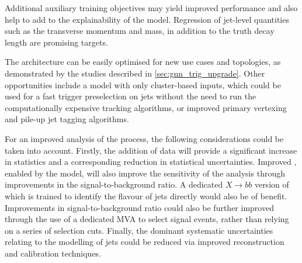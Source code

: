 Additional auxiliary training objectives may yield improved performance and also help to add to the explainability of the model.
Regression of jet-level quantities such as the transverse momentum and mass, in addition to the truth \bhadron decay length are promising targets.

The \GNN architecture can be easily optimised for new use cases and topologies, as demonstrated by the studies described in \cref{sec:gnn_trig_upgrade}.
Other opportunities include a model with only cluster-based inputs, which could be used for a fast trigger preselection on jets without the need to run the computationally expensive tracking algorithms, or improved primary vertexing and pile-up jet tagging algorithms.

For an improved analysis of the \VHbb process, the following considerations could be taken into account.
Firstly, the addition of \runthree data will provide a significant increase in statistics and a corresponding reduction in statistical uncertainties.
Improved \btagging, enabled by the \GNN model, will also improve the sensitivity of the analysis through improvements in the signal-to-background ratio.
A dedicated $X \rightarrow bb$ version of \GNN which is trained to identify the flavour of \largeR jets directly would also be of benefit.
Improvements in signal-to-background ratio could also be further improved through the use of a dedicated MVA to select signal events, rather than relying on a series of selection cuts.
Finally, the dominant systematic uncertainties relating to the modelling of \largeR jets could be reduced via improved reconstruction and calibration techniques.
